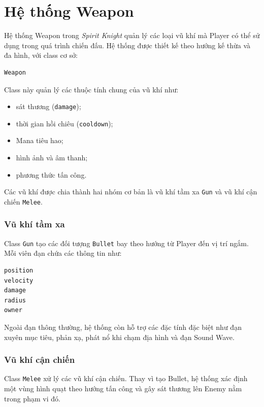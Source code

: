 \documentclass[12pt,a4paper]{report}
\begin{document}
    \chapter{Hệ thống Weapon}

    Hệ thống Weapon trong \textit{Spirit Knight} quản lý các loại vũ khí
    mà Player có thể sử dụng trong quá trình chiến đấu. Hệ thống được
    thiết kế theo hướng kế thừa và đa hình, với class cơ sở:

    \begin{verbatim}
Weapon
    \end{verbatim}

    Class này quản lý các thuộc tính chung của vũ khí như:

    \begin{itemize}
        \item sát thương (\texttt{damage});
        \item thời gian hồi chiêu (\texttt{cooldown});
        \item Mana tiêu hao;
        \item hình ảnh và âm thanh;
        \item phương thức tấn công.
    \end{itemize}

    Các vũ khí được chia thành hai nhóm cơ bản là vũ khí tầm xa
    \texttt{Gun} và vũ khí cận chiến \texttt{Melee}.

    \subsection{Vũ khí tầm xa}

    Class \texttt{Gun} tạo các đối tượng \texttt{Bullet} bay theo hướng
    từ Player đến vị trí ngắm. Mỗi viên đạn chứa các thông tin như:

    \begin{verbatim}
position
velocity
damage
radius
owner
    \end{verbatim}

    Ngoài đạn thông thường, hệ thống còn hỗ trợ các đặc tính đặc biệt
    như đạn xuyên mục tiêu, phản xạ, phát nổ khi chạm địa hình và
    đạn Sound Wave.

    \subsection{Vũ khí cận chiến}

    Class \texttt{Melee} xử lý các vũ khí cận chiến. Thay vì tạo Bullet,
    hệ thống xác định một vùng hình quạt theo hướng tấn công và gây
    sát thương lên Enemy nằm trong phạm vi đó.
\end{document}
